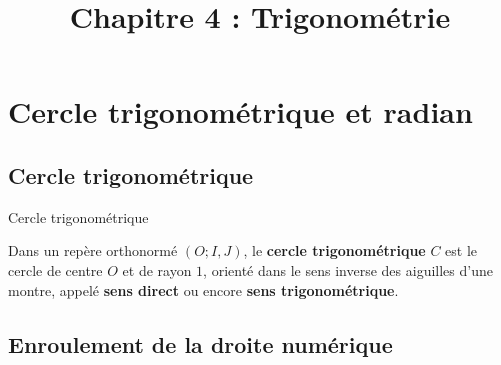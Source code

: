 \documentclass[11pt]{article}
\title{Chapitre 4 : Trigonométrie}
\date{}
\author{}
\begin{document}
\maketitle\thispagestyle{fancy}

%

\section{Cercle trigonométrique et radian}
\subsection{Cercle trigonométrique}

\begin{defi}{Cercle trigonométrique}
  \begin{minipage}{.5\textwidth}
    Dans un repère orthonormé $(O; I, J)$, le \textbf{cercle trigonométrique}
    $C$ est le cercle de centre $O$ et de rayon $1$, orienté dans le sens
    inverse des aiguilles d'une montre, appelé \textbf{sens direct} ou encore
    \textbf{sens trigonométrique}.
  \end{minipage}
  \begin{minipage}{.5\textwidth}
    \begin{center}
    \end{center}
  \end{minipage}
\end{defi}

\subsection{Enroulement de la droite numérique}
\end{document}
